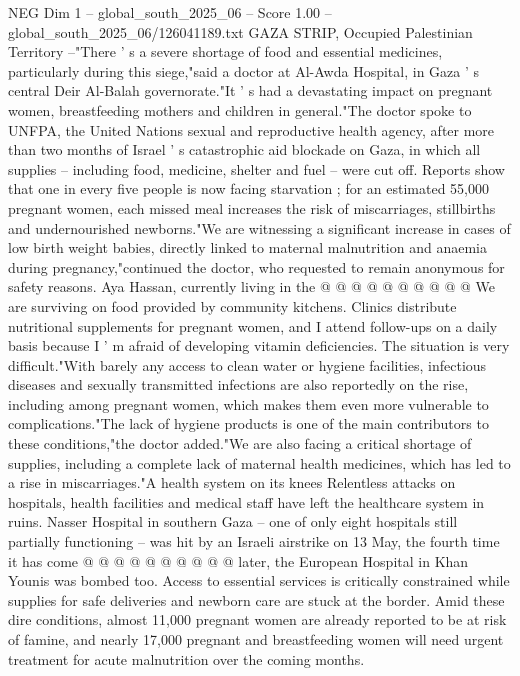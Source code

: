 \begin{textsample}{NEG Dim 1 – global\_south\_2025\_06 – Score 1.00 – global\_south\_2025\_06/126041189.txt}  \label{ex:f1_neg_243}
GAZA STRIP, Occupied Palestinian Territory --"There ' s a severe shortage of food and essential medicines, particularly during this siege,"said a doctor at Al-Awda Hospital, in Gaza ' s central Deir Al-Balah governorate."It ' s had a devastating impact on pregnant women, breastfeeding mothers and children in general."The doctor spoke to UNFPA, the United Nations sexual and reproductive health agency, after more than two months of Israel ' s catastrophic aid blockade on Gaza, in which all supplies -- including food, medicine, shelter and fuel -- were cut off.
Reports show that one in every five people is now facing starvation ; for an estimated 55,000 pregnant women, each missed meal increases the risk of miscarriages, stillbirths and undernourished newborns."We are witnessing a significant increase in cases of low birth weight babies, directly linked to maternal malnutrition and anaemia during pregnancy,"continued the doctor, who requested to remain anonymous for safety reasons.
Aya Hassan, currently living in the @ @ @ @ @ @ @ @ @ @ We are surviving on food provided by community kitchens.
Clinics distribute nutritional supplements for pregnant women, and I attend follow-ups on a daily basis because I ' m afraid of developing vitamin deficiencies.
The situation is very difficult."With barely any access to clean water or hygiene facilities, infectious diseases and sexually transmitted infections are also reportedly on the rise, including among pregnant women, which makes them even more vulnerable to complications."The lack of hygiene products is one of the main contributors to these conditions,"the doctor added."We are also facing a critical shortage of supplies, including a complete lack of maternal health medicines, which has led to a rise in miscarriages."A health system on its knees Relentless attacks on hospitals, health facilities and medical staff have left the healthcare system in ruins.
Nasser Hospital in southern Gaza -- one of only eight hospitals still partially functioning -- was hit by an Israeli airstrike on 13 May, the fourth time it has come @ @ @ @ @ @ @ @ @ @ later, the European Hospital in Khan Younis was bombed too.
Access to essential services is critically constrained while supplies for safe deliveries and newborn care are stuck at the border.
Amid these dire conditions, almost 11,000 pregnant women are already reported to be at risk of famine, and nearly 17,000 pregnant and breastfeeding women will need urgent treatment for acute malnutrition over the coming months.

\end{textsample}

